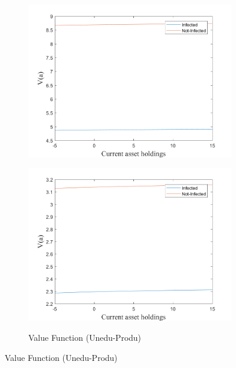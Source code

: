 \begin{figure}[H]
\begin{subfigure}{0.5\textwidth}
   \includegraphics[width=\linewidth,height = 0.22\textheight]{figures/art/FIG15.png}
    \label{fig_dert}
\end{subfigure}
\hspace*{\fill}
\begin{subfigure}{0.5\textwidth}\caption{Value Function (Unedu-Produ)}
   \includegraphics[width=\linewidth,height = 0.22\textheight]{figures/art/FIG16.png}
    \label{fig:x_b}
\end{subfigure}
\hspace*{\fill}
\label{lafigura7}
\end{figure}



